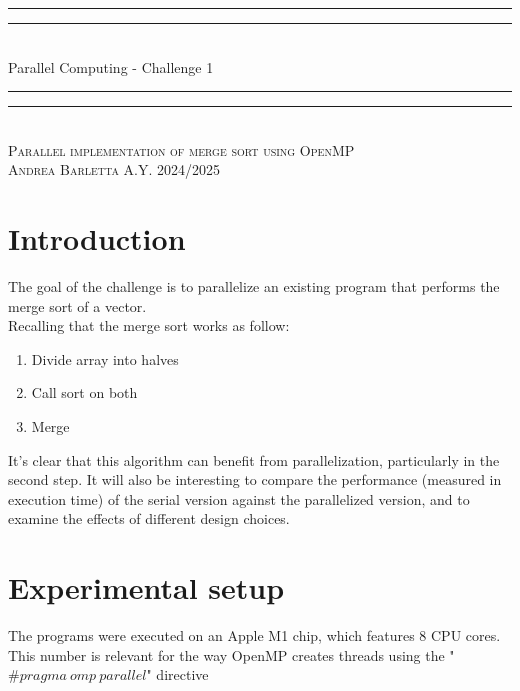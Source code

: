 \documentclass[a4paper, 11pt]{article}
\newlength{\drop}
\begin{document}
\begin{titlepage}
    \textheight
    \centering
    \vspace*{\baselineskip}
    \rule{\textwidth}{1.6pt}\vspace*{-\baselineskip}\vspace*{2pt}
    \rule{\textwidth}{0.4pt}\\[\baselineskip]
    {\LARGE Parallel Computing - Challenge 1}\\[0.2\baselineskip]
    \rule{\textwidth}{0.4pt}\vspace*{-\baselineskip}\vspace{3.2pt}
    \rule{\textwidth}{1.6pt}\\[\baselineskip]
    \scshape
    Parallel implementation of merge sort using OpenMP \\
    \vspace*{2\baselineskip}
    {\Large Andrea Barletta}
    \vfill
    {\scshape A.Y. 2024/2025}
  \end{titlepage}
\newpage         %

\section{Introduction}
The goal of the challenge is to parallelize an existing program that performs the merge sort of a vector.\\
Recalling that the merge sort works as follow:
\begin{enumerate}
    \item Divide array into halves
    \item Call sort on both
    \item Merge
\end{enumerate}
It's clear that this algorithm can benefit from parallelization, particularly in the second step. 
It will also be interesting to compare the performance (measured in execution time) of the serial version against the parallelized version, and to examine the effects of different design choices.
\section{Experimental setup}
The programs were executed on an Apple M1 chip, which features 8 CPU cores. This number is relevant for the way OpenMP creates threads using the "$\#pragma\ omp\ parallel$" directive
\end{document}
